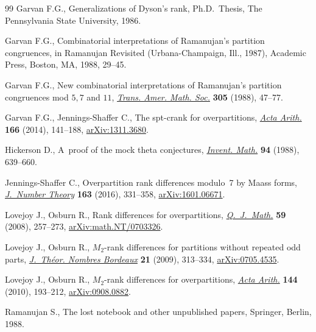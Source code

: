 \begin{thebibliography}{99}
Garvan F.G., Generalizations of {D}yson's rank, Ph.D.~Thesis, {T}he
  Pennsylvania State University, 1986.

Garvan F.G., Combinatorial interpretations of {R}amanujan's partition
  congruences, in Ramanujan Revisited ({U}rbana-{C}hampaign, {I}ll., 1987),
  Academic Press, Boston, MA, 1988, 29--45.

Garvan F.G., New combinatorial interpretations of {R}amanujan's partition
  congruences mod {$5,7$} and {$11$}, \href{https://doi.org/10.2307/2001040}{\textit{Trans. Amer. Math. Soc.}}
  \textbf{305} (1988), 47--77.

Garvan F.G., Jennings-Shaffer C., The spt-crank for overpartitions,
  \href{https://doi.org/10.4064/aa166-2-3}{\textit{Acta Arith.}} \textbf{166} (2014), 141--188, \href{https://arxiv.org/abs/1311.3680}{arXiv:1311.3680}.

Hickerson D., A~proof of the mock theta conjectures, \href{https://doi.org/10.1007/BF01394279}{\textit{Invent. Math.}}
  \textbf{94} (1988), 639--660.

Jennings-Shaffer C., Overpartition rank differences modulo~7 by {M}aass forms,
  \href{https://doi.org/10.1016/j.jnt.2015.11.018}{\textit{J.~Number Theory}} \textbf{163} (2016), 331--358, \href{https://arxiv.org/abs/1601.06671}{arXiv:1601.06671}.

Lovejoy J., Osburn R., Rank differences for overpartitions,
  \href{https://doi.org/10.1093/qmath/ham031}{\textit{Q.~J.~Math.}} \textbf{59} (2008), 257--273, \href{https://arxiv.org/abs/math.NT/0703326}{arXiv:math.NT/0703326}.

Lovejoy J., Osburn R., {$M_2$}-rank differences for partitions without repeated
  odd parts, \href{https://doi.org/10.5802/jtnb.673}{\textit{J.~Th\'eor. Nombres Bordeaux}} \textbf{21} (2009),
  313--334, \href{https://arxiv.org/abs/0705.4535}{arXiv:0705.4535}.

Lovejoy J., Osburn R., {$M_2$}-rank differences for overpartitions,
  \href{https://doi.org/10.4064/aa144-2-8}{\textit{Acta Arith.}} \textbf{144} (2010), 193--212, \href{https://arxiv.org/abs/0908.0882}{arXiv:0908.0882}.

Ramanujan S., The lost notebook and other unpublished papers, Springer, Berlin,
  1988.

\end{thebibliography}
